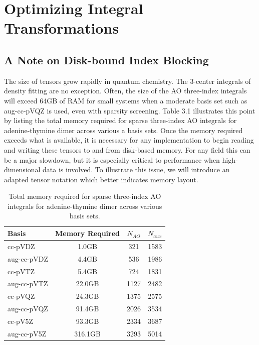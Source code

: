 \chapter{Optimizing Integral Transformations}

\section{A Note on Disk-bound Index Blocking}

The size of tensors grow rapidly in quantum chemistry. The 3-center integrals of density fitting are no exception.
Often, the size of the AO three-index integrals will exceed 64GB of RAM for small systems when
a moderate basis set such as aug-cc-pVQZ is used, even with sparsity screening. Table 3.1 illustrates this point by listing
the total memory required for sparse three-index AO integrals for adenine-thymine dimer across various a basis sets. Once the memory required
exceeds what is available, it is necessary for
any implementation to begin reading and writing these tensors to and from disk-based memory. For any field this can
be a major slowdown, but it is especially critical to performance when high-dimensional data is involved. To illustrate
this issue, we will introduce an adapted tensor notation which better indicates memory layout.

\begingroup
\begin{table}[H]
\centering
\renewcommand{\baselinestretch}{1}
\caption{Total memory required for sparse three-index AO integrals for adenine-thymine dimer across various basis sets.}
\begin{tabular}{l ccc}
\multicolumn{1}{l}{\textbf{Basis}} &
\multicolumn{1}{c}{\textbf{Memory Required}} &
\multicolumn{1}{c}{\textbf{$N_{AO}$}} &
\multicolumn{1}{c}{\textbf{$N_{aux}$}} \\
\hline

   cc-pVDZ   &      1.0GB    &    321   &     1583\\
aug-cc-pVDZ  &      4.4GB   &     536  &     1986\\
   cc-pVTZ   &      5.4GB    &    724   &     1831\\
aug-cc-pVTZ  &     22.0GB   &    1127  &     2482\\
   cc-pVQZ   &     24.3GB    &   1375   &     2575\\
aug-cc-pVQZ  &     91.4GB   &    2026  &     3534\\
   cc-pV5Z   &     93.3GB    &   2334   &     3687\\
aug-cc-pV5Z  &    316.1GB   &    3293  &     5014\\ 

\end{tabular}
\end{table}
\endgroup

